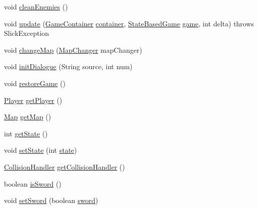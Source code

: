 \begin{DoxyCompactItemize}
\item 
void \mbox{\hyperlink{classstates_1_1_game_state_a0d50f38e70aa11191ecdc79a7df4c91b}{clean\+Enemies}} ()
\item 
void \mbox{\hyperlink{classstates_1_1_game_state_a5b3d7d529435681f3276acf887f137a7}{update}} (\mbox{\hyperlink{classorg_1_1newdawn_1_1slick_1_1_game_container}{Game\+Container}} \mbox{\hyperlink{classstates_1_1_game_state_a88b0df4b57ada742c53e4e1ee3b25827}{container}}, \mbox{\hyperlink{classorg_1_1newdawn_1_1slick_1_1state_1_1_state_based_game}{State\+Based\+Game}} \mbox{\hyperlink{classstates_1_1_game_state_a5f563e34a3fc7d777396b68e00b321f5}{game}}, int delta)  throws Slick\+Exception 
\item 
void \mbox{\hyperlink{classstates_1_1_game_state_a48c6c35635d58caba6995ea8dbd328cd}{change\+Map}} (\mbox{\hyperlink{classdetectors_1_1_map_changer}{Map\+Changer}} map\+Changer)
\item 
void \mbox{\hyperlink{classstates_1_1_game_state_a5561200f7d5c881b84ce6369f6fad705}{init\+Dialogue}} (String source, int num)
\item 
void \mbox{\hyperlink{classstates_1_1_game_state_a124cf2badd7eb25cf101898d6542a052}{restore\+Game}} ()
\item 
\mbox{\hyperlink{classentities_1_1_player}{Player}} \mbox{\hyperlink{classstates_1_1_game_state_acd86ca53723e41d0bc440cf07c753048}{get\+Player}} ()
\item 
\mbox{\hyperlink{classentities_1_1_map}{Map}} \mbox{\hyperlink{classstates_1_1_game_state_a5ef1de01f68adafec12bb3bb78010e2e}{get\+Map}} ()
\item 
int \mbox{\hyperlink{classstates_1_1_game_state_ab3aace79bbd3da8c4e838ac872ffb2a2}{get\+State}} ()
\item 
void \mbox{\hyperlink{classstates_1_1_game_state_a641263329dfd0fd93b595ccddfc393fa}{set\+State}} (int \mbox{\hyperlink{classstates_1_1_game_state_a5e07b1776e13d009e1a8c6a1e8140d04}{state}})
\item 
\mbox{\hyperlink{classentities_1_1_collision_handler}{Collision\+Handler}} \mbox{\hyperlink{classstates_1_1_game_state_af774083d4669d438a4c9248859f64c08}{get\+Collision\+Handler}} ()
\item 
boolean \mbox{\hyperlink{classstates_1_1_game_state_add3708153f0df86c7909ae99846f2597}{is\+Sword}} ()
\item 
void \mbox{\hyperlink{classstates_1_1_game_state_a4b4deae89360aac49314b7b0a1c87f6c}{set\+Sword}} (boolean \mbox{\hyperlink{classstates_1_1_game_state_af984dc048942d10169fb7127bcc30273}{sword}})

\end{DoxyCompactItemize}
